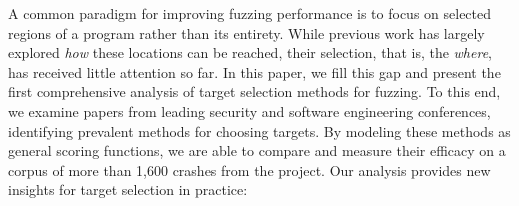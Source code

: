 A common paradigm for improving fuzzing performance is to focus on selected regions of a program rather than its entirety. While previous work has largely explored \emph{how} these locations can be reached, their selection, that is, the \emph{where}, has received little attention so far. 
%
In this paper, we fill this gap and present the first comprehensive analysis of target selection methods for fuzzing. To this end, we examine papers from leading security and software engineering conferences, identifying prevalent methods for choosing targets. By modeling these methods as general scoring functions, we are able to compare and measure their efficacy on a corpus of more than 1,600 crashes from the \ossfuzz{} project. 
%
Our analysis provides new insights for target selection in practice: 

